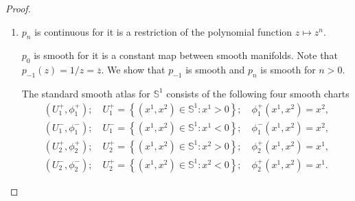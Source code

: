 \begin{proof}
    \begin{enumerate}[itemsep=0pt,label={(\alph*)}]
        \item \( p_{n} \) is continuous for it is a restriction of the polynomial function \( z \mapsto z^{n} \).

              \( p_{0} \) is smooth for it is a constant map between smooth manifolds. Note that \( p_{-1}(z) = 1/z = \overline{z} \). We show that \( p_{-1} \) is smooth and \( p_{n} \) is smooth for \( n > 0 \).

              The standard smooth atlas for \( \mathbb{S}^{1} \) consists of the following four smooth charts
              \begingroup
              \allowdisplaybreaks%
              \begin{align*}
                  (U_{1}^{+}, \phi_{1}^{+}); \quad U_{1}^{+} = \left\{ (x^{1}, x^{2}) \in \mathbb{S}^{1}: x^{1} > 0 \right\}; \quad \phi_{1}^{+}(x^{1}, x^{2}) = x^{2}, \\
                  (U_{1}^{-}, \phi_{1}^{-}); \quad U_{1}^{-} = \left\{ (x^{1}, x^{2}) \in \mathbb{S}^{1}: x^{1} < 0 \right\}; \quad \phi_{1}^{-}(x^{1}, x^{2}) = x^{2}, \\
                  (U_{2}^{+}, \phi_{2}^{+}); \quad U_{2}^{+} = \left\{ (x^{1}, x^{2}) \in \mathbb{S}^{1}: x^{2} > 0 \right\}; \quad \phi_{2}^{+}(x^{1}, x^{2}) = x^{1}, \\
                  (U_{2}^{-}, \phi_{2}^{-}); \quad U_{2}^{+} = \left\{ (x^{1}, x^{2}) \in \mathbb{S}^{1}: x^{2} < 0 \right\}; \quad \phi_{2}^{+}(x^{1}, x^{2}) = x^{1}.
              \end{align*}
              \endgroup


\end{enumerate}
\end{proof}

